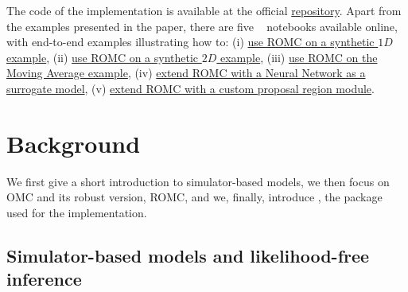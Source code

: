 \documentclass[article, shortnames]{jss}
\begin{document}
The code of the implementation is available at the official 
\href{https://github.com/elfi-dev/elfi}{repository}. Apart from the
examples presented in the paper, there are five ~\citet{Bisong2019} notebooks available online, with
end-to-end examples illustrating how to: (i)
\href{https://colab.research.google.com/drive/1lGRp0XrNfZ64NN0ASB_tYEKowXwlveDC?usp=sharing}{use ROMC
  on a synthetic \(1D\) example}, (ii)
\href{https://colab.research.google.com/drive/1Fof_WmCi1YizzSI_63aEsbLXsno5gSZ3?usp=sharing}{use ROMC
  on a synthetic \(2D\) example}, (iii)
\href{https://colab.research.google.com/drive/1nkdACQ370SSc0KB1bHv4sBRaxMlMqoNH?usp=sharing}{use ROMC
  on the Moving Average example}, (iv)
\href{https://colab.research.google.com/drive/1_jHVxPSH3XcNOORZJpLU0SPzs0PF8CQ5?usp=sharing}{extend ROMC with a Neural Network as a surrogate model}, (v)
\href{https://colab.research.google.com/drive/1RzB-V1QueP1y1nyzv_VOqR1nVz3DUH3v?usp=sharing}{extend ROMC with a custom proposal region module}.




\section[Background]{Background}

We first give a short introduction to simulator-based models, we then
focus on OMC and its robust version, ROMC, and we, finally, introduce
, the  package used for the implementation.

\subsection{Simulator-based models and likelihood-free inference}
\end{document}

